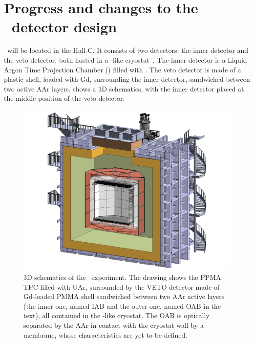 \section{Progress and changes to the \DSk\  detector  design}
\label{sec:DSk}

\DSks\ will be located in the Hall-C.  It consists of two detectors: the inner detector and the veto detector, both hosted in a \pDUNE-like cryostat~\cite{Abi:2017wp,Acciarri:2016wz}.   The inner detector is a Liquid Argon Time Projection Chamber (\LArTPC) filled with \UAr.  The veto detector is made of a plastic shell, loaded with Gd, surrounding the inner detector, sandwiched between two active AAr layers.
  shows a 3D schematics, with the inner detector placed at the middle position of the veto detector.

\begin{figure}[t!]
\includegraphics[width=\columnwidth]{Figures/DSk3D.pdf}
\caption{3D schematics of the \DSk\ experiment.  The drawing shows  the PPMA  TPC  filled with UAr, surrounded by the VETO detector made of Gd-loaded  PMMA  shell sandwiched between two AAr active layers (the inner one, named IAB and the outer one, named OAB in the text), all contained in the  \pDUNE-like cryostat. The OAB is optically separated by the AAr in  contact with the cryostat wall by a membrane, whose characteristics are yet to be defined. }
\label{fig:DSk3D}
\end{figure}

